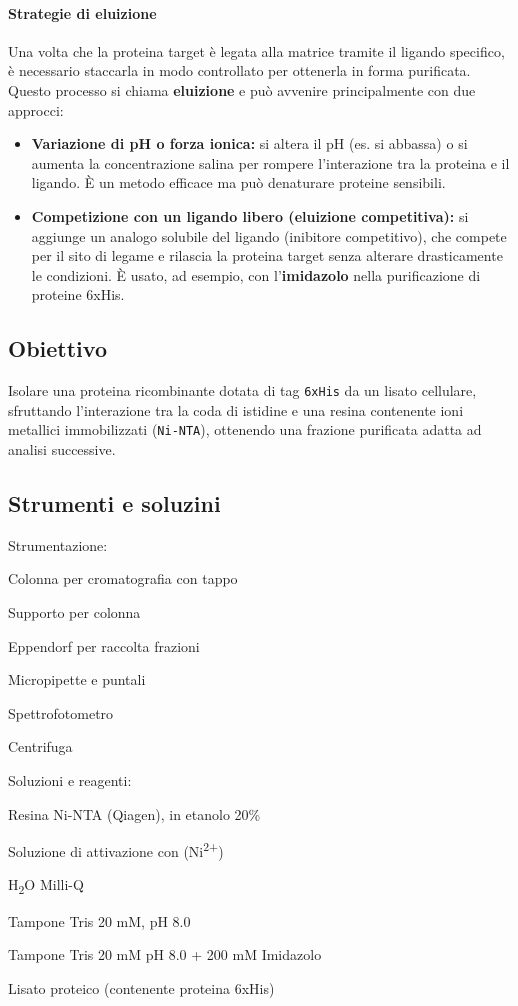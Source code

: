 \paragraph{Strategie di eluizione}
Una volta che la proteina target è legata alla matrice tramite il ligando specifico, è necessario staccarla in modo controllato per ottenerla in forma purificata.  
Questo processo si chiama \textbf{eluizione} e può avvenire principalmente con due approcci:

\begin{itemize}\footnotesize
  \item \textbf{Variazione di pH o forza ionica:} si altera il pH (es. si abbassa) o si aumenta la concentrazione salina per rompere l’interazione tra la proteina e il ligando. È un metodo efficace ma può denaturare proteine sensibili.
  
  \item \textbf{Competizione con un ligando libero (eluizione competitiva):} si aggiunge un analogo solubile del ligando (inibitore competitivo), che compete per il sito di legame e rilascia la proteina target senza alterare drasticamente le condizioni. È usato, ad esempio, con l’\textbf{imidazolo} nella purificazione di proteine 6xHis.
\end{itemize}


\newpage
{}
\subsection{Obiettivo}
Isolare una proteina ricombinante dotata di tag \texttt{6xHis} da un lisato cellulare, sfruttando l’interazione tra la coda di istidine e una resina contenente ioni metallici immobilizzati (\texttt{Ni-NTA}), ottenendo una frazione purificata adatta ad analisi successive.

\subsection{Strumenti e soluzini}
\twoColumnLayout
  {Strumentazione:}
  {
  \item Colonna per cromatografia con tappo
  \item Supporto per colonna
  \item Eppendorf per raccolta frazioni
  \item Micropipette e puntali
  \item Spettrofotometro
  \item Centrifuga
  }
  {Soluzioni e reagenti:}
  {
  \item Resina Ni-NTA (Qiagen), in etanolo 20\%
  \item Soluzione di attivazione con (Ni\textsuperscript{2+})
  \item H\textsubscript{2}O Milli-Q
  \item Tampone Tris 20 mM, pH 8.0
  \item Tampone Tris 20 mM pH 8.0 + 200 mM Imidazolo
  \item Lisato proteico (contenente proteina 6xHis)
  }

